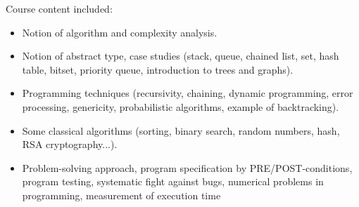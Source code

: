 Course content included:
\begin{itemize}
    \item Notion of algorithm and complexity analysis.
    \item Notion of abstract type, case studies (stack, queue, chained list, set, hash table, bitset, priority queue, introduction to trees and graphs).
    \item Programming techniques (recursivity, chaining, dynamic programming, error processing, genericity, probabilistic algorithms, example of backtracking).
    \item Some classical algorithms (sorting, binary search, random numbers, hash, RSA cryptography...).
    \item Problem-solving approach, program specification by PRE/POST-conditions, program testing, systematic fight against bugs, numerical problems in programming, measurement of execution time
\end{itemize}
